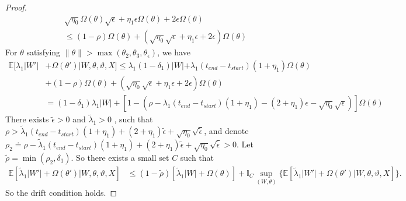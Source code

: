 \begin{proof}
\begin{align*}
  &\sqrt{\eta_0}\Omega(\theta) \sqrt{\epsilon} +  \eta_1 \epsilon \Omega(\theta) + 2\epsilon \Omega(\theta)\\
  & \leq (1 - \rho) \Omega(\theta) + (\sqrt{\eta_0} \sqrt{\epsilon} +  \eta_1 \epsilon + 2\epsilon) \Omega(\theta)
\end{align*}
For $\theta$ satisfying $ \| \theta \| >\max(\theta_2, \theta_3, \theta_\epsilon)$, we have %
\begin{align*}
\mathbb{E}[\lambda_1 | W'| &+ \Omega(\theta')| W, \theta, \vartheta, X] \le \lambda_1(1 - \delta_1)|W| + \lambda_1 (t_{end} - t_{start}) (1 + \eta_1)\Omega(\theta) \\
&+  (1 - \rho) \Omega(\theta) + (\sqrt{\eta_0} \sqrt{\epsilon} +  \eta_1 \epsilon + 2\epsilon) \Omega(\theta)\\
& = (1 - \delta_1)\lambda_1 |W| + [1 - (\rho - \lambda_1 (t_{end} - t_{start}) (1 + \eta_1) - (2 + \eta_1)\epsilon - \sqrt{\eta_0} \sqrt{\epsilon})]\Omega(\theta)
\end{align*}
There exists  $\tilde{\epsilon} > 0$ and $\tilde{\lambda}_1 >0 $ , such that $\rho >  \tilde{\lambda}_1 (t_{end} - t_{start}) (1 + \eta_1) + (2 + \eta_1)\tilde{\epsilon} + \sqrt{\eta_0} \sqrt{\tilde{\epsilon}}$, and denote $\rho_2  \doteq \rho - \tilde{\lambda}_1 (t_{end} - t_{start}) (1 + \eta_1) + (2 + \eta_1)\tilde{\epsilon} + \sqrt{\eta_0} \sqrt{\tilde{\epsilon}}
 > 0$. Let $\tilde{\rho} = \min(\rho_2, \delta_1)$. So there exists a small set $C$ such that \begin{align*}
\mathbb{E}[\tilde{\lambda}_1 | W'| + \Omega(\theta')| W, \theta, \vartheta, X] &\le (1 - \tilde{\rho}) [\tilde{\lambda}_1 | W| + \Omega(\theta)] +
\mathbb{I}_{C} \sup_{(W, \theta)} \{ \mathbb{E}[\tilde{\lambda}_1 | W'| + \Omega(\theta')| W, \theta, \vartheta, X] \}.
\end{align*}
So the drift condition holds.

\end{proof}
